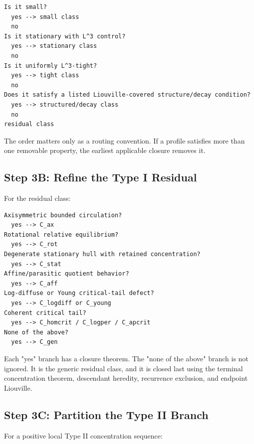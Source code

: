 \documentclass[11pt]{amsart}
\begin{document}
\begin{center}
\begin{minipage}{0.92\linewidth}
\scriptsize
\begin{verbatim}
Is it small?
  yes --> small class
  no
Is it stationary with L^3 control?
  yes --> stationary class
  no
Is it uniformly L^3-tight?
  yes --> tight class
  no
Does it satisfy a listed Liouville-covered structure/decay condition?
  yes --> structured/decay class
  no
residual class
\end{verbatim}
\end{minipage}
\end{center}

The order matters only as a routing convention.  If a profile satisfies more than one removable property, the earliest applicable closure removes it.

\subsection{Step 3B: Refine the Type I Residual}

For the residual class:

\begin{center}
\begin{minipage}{0.92\linewidth}
\scriptsize
\begin{verbatim}
Axisymmetric bounded circulation?
  yes --> C_ax
Rotational relative equilibrium?
  yes --> C_rot
Degenerate stationary hull with retained concentration?
  yes --> C_stat
Affine/parasitic quotient behavior?
  yes --> C_aff
Log-diffuse or Young critical-tail defect?
  yes --> C_logdiff or C_young
Coherent critical tail?
  yes --> C_homcrit / C_logper / C_apcrit
None of the above?
  yes --> C_gen
\end{verbatim}
\end{minipage}
\end{center}

Each "yes" branch has a closure theorem.  The "none of the above" branch is not ignored.  It is the generic residual class, and it is closed last using the terminal concentration theorem, descendant heredity, recurrence exclusion, and endpoint Liouville.

\subsection{Step 3C: Partition the Type II Branch}

For a positive local Type II concentration sequence:
\end{document}

